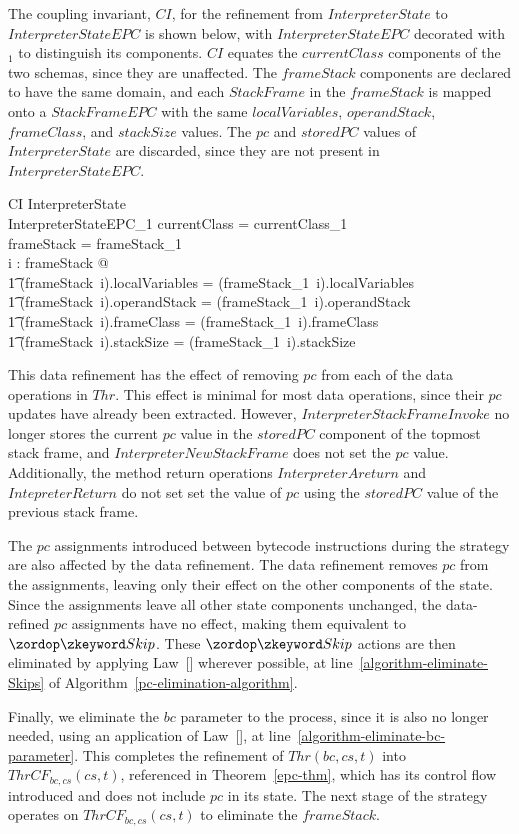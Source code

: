 The coupling invariant, $CI$, for the refinement from
$InterpreterState$ to $InterpreterStateEPC$ is shown below, with
$InterpreterStateEPC$ decorated with ${}_1$ to distinguish its
components.
$CI$ equates the $currentClass$ components of the two schemas, since
they are unaffected.
The $frameStack$ components are declared to have the same domain, and
each $StackFrame$ in the $frameStack$ is mapped onto a $StackFrameEPC$
with the same $localVariables$, $operandStack$, $frameClass$, and
$stackSize$ values.
The $pc$ and $storedPC$ values of $InterpreterState$ are discarded,
since they are not present in $InterpreterStateEPC$.
\begin{schema}{CI}
  InterpreterState \\
  InterpreterStateEPC_1
\where
  currentClass = currentClass_1 \\
  \dom frameStack = \dom frameStack_1 \\
  \forall i : \dom frameStack @ \\
  \t1 (frameStack~i).localVariables = (frameStack_1~i).localVariables \land \\
  \t1 (frameStack~i).operandStack = (frameStack_1~i).operandStack \land \\
  \t1 (frameStack~i).frameClass = (frameStack_1~i).frameClass \land \\
  \t1 (frameStack~i).stackSize = (frameStack_1~i).stackSize
\end{schema}

This data refinement has the effect of removing $pc$ from each of the
data operations in $Thr$.
This effect is minimal for most data operations, since their $pc$
updates have already been extracted. 
However, $InterpreterStackFrameInvoke$ no longer stores the current
$pc$ value in the $storedPC$ component of the topmost stack frame, and
$InterpreterNewStackFrame$ does not set the $pc$ value.
Additionally, the method return operations $InterpreterAreturn$ and
$IntepreterReturn$ do not set set the value of $pc$ using the
$storedPC$ value of the previous stack frame.

The $pc$ assignments introduced between bytecode instructions during
the strategy are also affected by the data refinement.
The data refinement removes $pc$ from the assignments, leaving only
their effect on the other components of the state.
Since the assignments leave all other state components unchanged, the
data-refined $pc$ assignments have no effect, making them equivalent
to $\Skip$.
These $\Skip$ actions are then eliminated by applying
Law~[] wherever possible, at
line~\ref{algorithm-eliminate-Skips} of
Algorithm~\ref{pc-elimination-algorithm}.

Finally, we eliminate the $bc$ parameter to the process, since it is
also no longer needed, using an application of
Law~[], at
line~\ref{algorithm-eliminate-bc-parameter}.
This completes the refinement of $Thr(bc,cs,t)$ into
$ThrCF_{bc,cs}(cs,t)$, referenced in
Theorem~\ref{epc-thm}, which has its control flow
introduced and does not include $pc$ in its state.
The next stage of the strategy operates on $ThrCF_{bc,cs}(cs,t)$ to
eliminate the $frameStack$.
